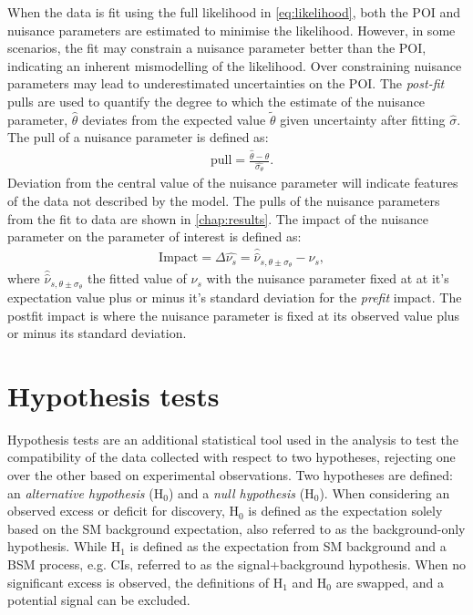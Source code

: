 When the data is fit using the full likelihood in \cref{eq:likelihood}, both the POI and nuisance parameters are estimated to minimise the likelihood. However, in some scenarios, the fit may constrain a nuisance parameter better than the POI, indicating an inherent mismodelling of the likelihood. Over constraining nuisance parameters may lead to underestimated uncertainties on the POI. The \emph{post-fit} pulls are used to quantify the degree to which the estimate of the nuisance parameter, $\hat{\theta}$ deviates from the expected value $\tilde{\theta}$ given uncertainty after fitting $\hat{\sigma}$. The pull of a nuisance parameter is defined as: 
\begin{equation}
    \label{eq:nppull}
    \begin{aligned}
        & \mathrm{pull} = \frac{\hat{\theta} -{\theta}}{\hat{\sigma_\theta}}.
    \end{aligned}
\end{equation}
Deviation from the central value of the nuisance parameter will indicate features of the data not described by the model. The pulls of the nuisance parameters from the fit to data are shown in \cref{chap:results}. The impact of the nuisance parameter on the parameter of interest is defined as:
\begin{equation}
    \label{eq:npinpact}
    \begin{aligned}
        & \mathrm{Impact} = \Delta \hat{\nu_s} = \hat{\hat{\nu}}_{s,\theta \pm \sigma_\theta} - \hat{\nu}_s,
    \end{aligned}
\end{equation}
where $\hat{\hat{\nu}}_{s,\theta \pm \sigma_\theta}$ the fitted value of $\nu_s$ with the nuisance parameter fixed at at it's expectation value plus or minus it's standard deviation for the \emph{prefit} impact. The postfit impact is where the nuisance parameter is fixed at its observed value plus or minus its standard deviation. 


\section{Hypothesis tests}
Hypothesis tests are an additional statistical tool used in the analysis to test the compatibility of the data collected with respect to two hypotheses, rejecting one over the other based on experimental observations. Two hypotheses are defined: an \emph{alternative hypothesis} ($\mathrm{H_0}$) and a \emph{null hypothesis} ($\mathrm{H_0}$). When considering an observed excess or deficit for discovery, $\mathrm{H_0}$ is defined as the expectation solely based on the SM background expectation, also referred to as the background-only hypothesis. While $\mathrm{H_1}$ is defined as the expectation from SM background and a BSM process, e.g. CIs, referred to as the signal+background hypothesis. When no significant excess is observed, the definitions of $\mathrm{H_1}$ and $\mathrm{H_0}$ are swapped, and a potential signal can be excluded. 

